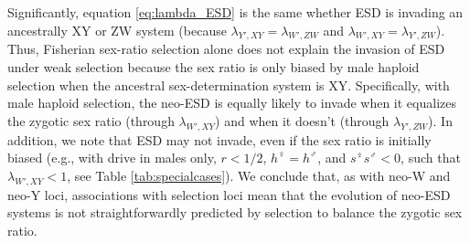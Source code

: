 \documentclass[12pt]{article}
\begin{document}

Significantly, equation \eqref{eq:lambda_ESD} is the same whether ESD is invading an ancestrally XY or ZW system (because $\lambda_{Y',XY} = \lambda_{W',ZW}$ and $\lambda_{W',XY} = \lambda_{Y',ZW}$).
Thus, Fisherian sex-ratio selection alone does not explain the invasion of ESD under weak selection because the sex ratio is only biased by male haploid selection when the ancestral sex-determination system is XY. 
Specifically, with male haploid selection, the neo-ESD is equally likely to invade when it equalizes the zygotic sex ratio (through $\lambda_{W',XY}$) and when it doesn't (through $\lambda_{Y',ZW}$). 
In addition, we note that ESD may not invade, even if the sex ratio is initially biased (e.g., with drive in males only, $r<1/2$, $h^\female=h^\male$, and $s^\female s^\male<0$, such that $\lambda_{W',XY}<1$, see Table \ref{tab:specialcases}). 
We conclude that, as with neo-W and neo-Y loci, associations with selection loci mean that the evolution of neo-ESD systems is not straightforwardly predicted by selection to balance the zygotic sex ratio.


\end{document}
